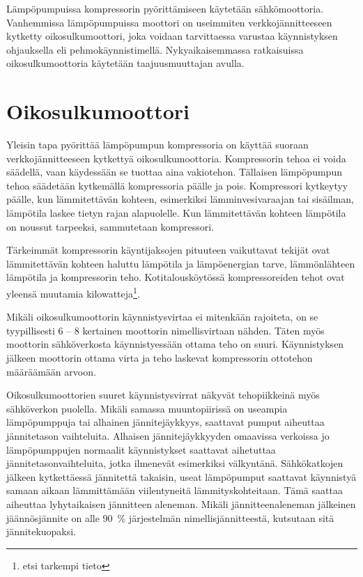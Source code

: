   Lämpöpumpuissa kompressorin pyörittämiseen käytetään sähkömoottoria. Vanhemmissa lämpöpumpuissa moottori on useimmiten verkkojännitteeseen kytketty oikosulkumoottori, joka voidaan tarvittaessa varustaa käynnistyksen ohjauksella eli pehmokäynnistimellä. Nykyaikaisemmassa ratkaisuissa oikosulkumoottoria käytetään taajuusmuuttajan avulla.

\section{Oikosulkumoottori}
  Yleisin tapa pyörittää lämpöpumpun kompressoria on käyttää suoraan verkkojännitteeseen kytkettyä oikosulkumoottoria. Kompressorin tehoa ei voida säädellä, vaan käydessään se tuottaa aina vakiotehon. Tällaisen lämpöpumpun tehoa säädetään kytkemällä kompressoria päälle ja pois. Kompressori kytkeytyy päälle, kun lämmitettävän kohteen, esimerkiksi lämminvesivaraajan tai sisäilman, lämpötila laskee tietyn rajan alapuolelle. Kun lämmitettävän kohteen lämpötila on noussut tarpeeksi, sammutetaan kompressori.

  Tärkeimmät kompressorin käyntijaksojen pituuteen vaikuttavat tekijät ovat lämmitettävän kohteen haluttu lämpötila ja lämpöenergian tarve, lämmönlähteen lämpötila ja kompressorin teho. Kotitalousköytössä kompressoreiden tehot ovat yleensä muutamia kilowatteja\footnote{etsi tarkempi tieto}.

  Mikäli oikosulkumoottorin käynnistysvirtaa ei mitenkään rajoiteta, on se tyypillisesti 6 -- 8 kertainen moottorin nimellisvirtaan nähden. Täten myös moottorin sähköverkosta käynnistyessään ottama teho on suuri.\parencite{pehmokaynnistinopas} Käynnistyksen jälkeen moottorin ottama virta ja teho laskevat kompressorin ottotehon määräämään arvoon.

  Oikosulkumoottorien suuret käynnistysvirrat näkyvät tehopiikkeinä myös sähköverkon puolella. Mikäli samassa muuntopiirissä on useampia lämpöpumppuja tai alhainen jännitejäykkyys, saattavat pumput aiheuttaa jännitetason vaihteluita. Alhaisen jännitejäykkyyden omaavissa verkoissa jo lämpöpumppujen normaalit käynnistykset saattavat aihetuttaa jännitetasonvaihteluita, jotka ilmenevät esimerkiksi välkyntänä\parencite{SFSEN50160}. Sähkökatkojen jälkeen kytkettäessä jännitettä takaisin, useat lämpöpumput saattavat käynnistyä samaan aikaan lämmittämään viilentyneitä lämmityskohteitaan. Tämä saattaa aiheuttaa lyhytaikaisen jännitteen aleneman. Mikäli jännitteenaleneman jälkeinen jäännösjännite on alle \SI{90}{\percent} järjestelmän nimellisjännitteestä, kutsutaan sitä jännitekuopaksi\parencite{SFSEN50160}.

